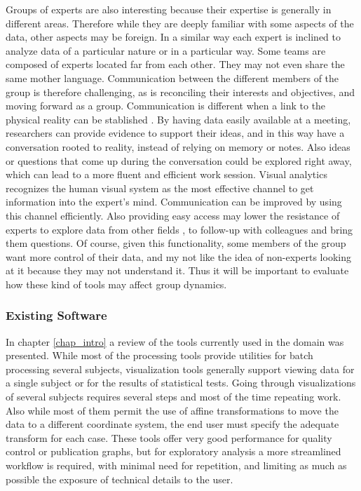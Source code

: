 Groups of experts are also interesting because their expertise is generally in different areas. Therefore while they are deeply familiar with some aspects of the data, other aspects may be foreign. In a similar way each expert is inclined to analyze data of a particular nature or in a particular way. Some teams are composed of experts located far from each other. They may not even share the same mother language. Communication between the different members of the group is therefore challenging, as is reconciling their interests and objectives, and moving forward as a group. Communication is different when a link to the physical reality can be stablished \autocite{rojas_arredondo_dinamica_2010}. By having data easily available at a meeting, researchers can provide evidence to support their ideas, and in this way have a conversation rooted to reality, instead of relying on memory or notes. Also ideas or questions that come up during the conversation could be explored right away, which can lead to a more fluent and efficient work session. Visual analytics recognizes the human visual system as the most effective channel to get information into the expert's mind. Communication can be improved by using this channel efficiently. Also providing easy access may lower the resistance of experts to explore data from other fields , to follow-up with colleagues and bring them questions. Of course, given this functionality, some members of the group want more control of their data, and my not like the idea of non-experts looking at it because they may not understand it. Thus it will be important to evaluate how these kind of tools may affect group dynamics.


\subsubsection{Existing Software}
In chapter \ref{chap_intro} a review of the tools currently used in the domain was presented. While most of the processing tools provide utilities for batch processing several subjects, visualization tools generally support viewing data for a single subject or for the results of statistical tests. Going through visualizations of several subjects requires several steps and most of the time repeating work. Also while most of them permit the use of affine transformations to move the data to a different coordinate system, the end user must specify the adequate transform for each case. These tools offer very good performance for quality control or publication graphs, but for exploratory analysis a more streamlined workflow is required, with minimal need for repetition, and limiting as much as possible the exposure of technical details to the user. 

